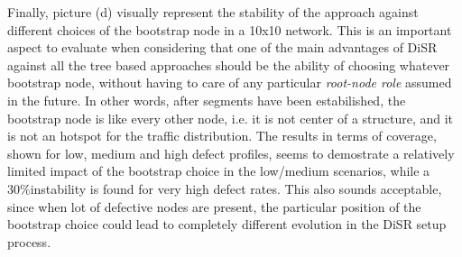 Finally, picture (d) visually represent  the stability of the approach
against different choices of the bootstrap node in a 10x10 network.
This is an important aspect to evaluate when considering that one of
the main advantages of DiSR against all the tree based approaches
should be the ability of choosing whatever bootstrap node, without
having to care of any particular \emph{root-node role} assumed in the future.
In other words, after segments have been estabilished, the bootstrap node
is like every other node, i.e. it is not center of a structure, and it
is not an hotspot for the traffic distribution. The results in terms
of coverage,  shown for low, medium and high defect profiles, seems to
demostrate a relatively limited impact of the bootstrap choice in
the low/medium scenarios, while a 30\%instability is found for very high defect
rates. This also sounds acceptable, since when lot of defective nodes
are present, the particular position of the bootstrap choice could
lead to completely different evolution in the DiSR setup process.


